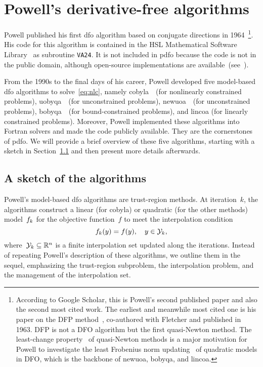 \documentclass[
    smallextended,  %
    draft,          %
]{svjour3}
\newcommand{\R}{\mathbb{R}}
\newcommand{\objm}[1][k]{\obj\ifthenelse{\equal{#1}{}}{}{_{#1}}}
\newcommand{\obj}{f}
\newcommand{\xpt}[1][k]{\mathcal{Y}\ifthenelse{\equal{#1}{}}{}{_{#1}}}
\begin{document}
\section{Powell's derivative-free algorithms}
\label{sec:powell}

Powell published his first \gls{dfo} algorithm based on conjugate directions in 1964~\cite{Powell_1964}\footnote{According to Google Scholar, this is Powell's second published paper and also the second most cited work.
The earliest and meanwhile most cited one is his paper on the DFP method~\cite{Fletcher_Powell_1963},
co-authored with Fletcher and published in 1963. DFP is not a DFO algorithm but the first
quasi-Newton method. The least-change property~\cite{Dennis_Schnabel_1979} of quasi-Newton methods
is a major motivation for Powell to investigate the least Frobenius norm updating~\cite{Powell_2004b}
of quadratic models in DFO, which is the backbone of \gls{newuoa}, \gls{bobyqa}, and \gls{lincoa}.}.
His code for this algorithm is contained in the HSL Mathematical Software Library~\cite{HSL} as subroutine \texttt{VA24}.
It is not included in \gls{pdfo} because the code is not in the public domain, although open-source implementations are available~(see~\cite[footnote~4]{Conn_Scheinberg_Toint_1997b}).

From the 1990s to the final days of his career, Powell developed five model-based \gls{dfo} algorithms to solve~\eqref{eq:nlc}, namely \gls{cobyla}~\cite{Powell_1994}~(for nonlinearly constrained problems), \gls{uobyqa}~\cite{Powell_2002}~(for unconstrained problems), \gls{newuoa}~\cite{Powell_2006}~(for unconstrained problems), \gls{bobyqa}~\cite{Powell_2009}~(for bound-constrained problems), and \gls{lincoa} (for linearly constrained problems).
Moreover, Powell implemented these algorithms into Fortran solvers and made the code publicly available.
They are the cornerstones of \gls{pdfo}.
We will provide a brief overview of these five algorithms, starting with a sketch in Section~\ref{ssec:sketch} and then present more details afterwards.

\subsection{A sketch of the algorithms}
\label{ssec:sketch}

Powell's model-based \gls{dfo} algorithms are trust-region methods.
At iteration~$k$, the algorithms construct a linear (for \gls{cobyla}) or quadratic (for the other methods) model~$\objm$ for the objective function~$f$ to meet the interpolation condition
\begin{equation}
    \label{eq:itpls}
    \objm(y) = \obj(y), \quad y \in \xpt,
\end{equation}
where~$\xpt \subseteq \R^n$ is a finite interpolation set updated along the iterations.
Instead of repeating Powell's description of these algorithms, we outline them in the sequel, emphasizing the trust-region subproblem, the interpolation problem, and the management of the interpolation set.
\end{document}
